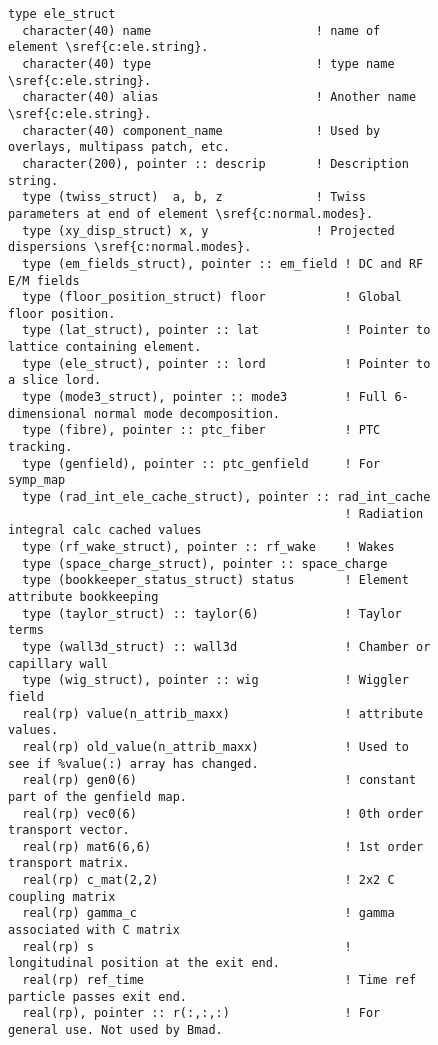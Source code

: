\begin{figure}[tb]
\centering
\footnotesize
\begin{verbatim}
type ele_struct
  character(40) name                       ! name of element \sref{c:ele.string}.
  character(40) type                       ! type name \sref{c:ele.string}.
  character(40) alias                      ! Another name \sref{c:ele.string}.
  character(40) component_name             ! Used by overlays, multipass patch, etc.
  character(200), pointer :: descrip       ! Description string.
  type (twiss_struct)  a, b, z             ! Twiss parameters at end of element \sref{c:normal.modes}.
  type (xy_disp_struct) x, y               ! Projected dispersions \sref{c:normal.modes}.
  type (em_fields_struct), pointer :: em_field ! DC and RF E/M fields
  type (floor_position_struct) floor           ! Global floor position.
  type (lat_struct), pointer :: lat            ! Pointer to lattice containing element.
  type (ele_struct), pointer :: lord           ! Pointer to a slice lord.
  type (mode3_struct), pointer :: mode3        ! Full 6-dimensional normal mode decomposition.
  type (fibre), pointer :: ptc_fiber           ! PTC tracking.
  type (genfield), pointer :: ptc_genfield     ! For symp_map
  type (rad_int_ele_cache_struct), pointer :: rad_int_cache  
                                               ! Radiation integral calc cached values 
  type (rf_wake_struct), pointer :: rf_wake    ! Wakes
  type (space_charge_struct), pointer :: space_charge 
  type (bookkeeper_status_struct) status       ! Element attribute bookkeeping
  type (taylor_struct) :: taylor(6)            ! Taylor terms
  type (wall3d_struct) :: wall3d               ! Chamber or capillary wall
  type (wig_struct), pointer :: wig            ! Wiggler field
  real(rp) value(n_attrib_maxx)                ! attribute values.
  real(rp) old_value(n_attrib_maxx)            ! Used to see if %value(:) array has changed.
  real(rp) gen0(6)                             ! constant part of the genfield map.
  real(rp) vec0(6)                             ! 0th order transport vector.
  real(rp) mat6(6,6)                           ! 1st order transport matrix.
  real(rp) c_mat(2,2)                          ! 2x2 C coupling matrix
  real(rp) gamma_c                             ! gamma associated with C matrix
  real(rp) s                                   ! longitudinal position at the exit end.
  real(rp) ref_time                            ! Time ref particle passes exit end.
  real(rp), pointer :: r(:,:,:)                ! For general use. Not used by Bmad.

\end{verbatim}
\end{figure}
